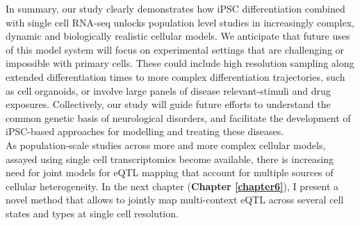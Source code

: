 In summary, our study clearly demonstrates how iPSC differentiation combined with single cell RNA-seq unlocks population level studies in increasingly complex, dynamic and biologically realistic cellular models. 
We anticipate that future uses of this model system will focus on experimental settings that are challenging or impossible with primary cells. 
These could include high resolution sampling along extended differentiation times to more complex differentiation trajectories, such as cell organoids, or involve large panels of disease relevant-stimuli and drug exposures. 
Collectively, our study will guide future efforts to understand the common genetic basis of neurological disorders, and facilitate the development of iPSC-based approaches for modelling and treating these diseases. \\

As population-scale studies across more and more complex cellular models, assayed using single cell transcriptomics become available, there is increasing need for joint models for eQTL mapping that account for multiple sources of cellular heterogeneity. 
In the next chapter (\textbf{Chapter 
\ref{chapter6}}),
I present a  novel method that allows to jointly map multi-context eQTL across several cell states and types at single cell resolution.

